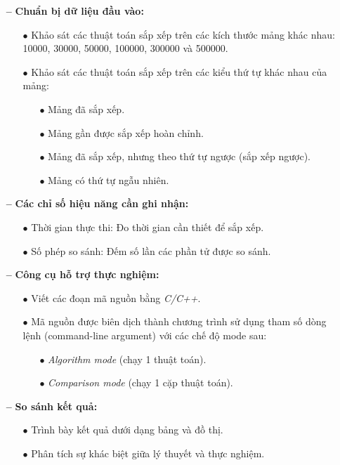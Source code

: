 \begin{itemize}
    \item [\textbf{--}] \textbf{Chuẩn bị dữ liệu đầu vào:}
    \begin{itemize}
    \item [$\bullet$] Khảo sát các thuật toán sắp xếp trên các kích thước mảng khác nhau: 10000, 30000, 50000, 100000, 300000 và 500000.
    \item [$\bullet$] Khảo sát các thuật toán sắp xếp trên các kiểu thứ tự khác nhau của mảng:
        \begin{itemize}
            \item [$\bullet$] Mảng đã sắp xếp.
            \item [$\bullet$] Mảng gần được sắp xếp hoàn chỉnh.
            \item [$\bullet$] Mảng đã sắp xếp, nhưng theo thứ tự ngược (sắp xếp ngược).
            \item [$\bullet$] Mảng có thứ tự ngẫu nhiên.
        \end{itemize}
    \end{itemize}
    \item [\textbf{--}] \textbf{Các chỉ số hiệu năng cần ghi nhận:}
    \begin{itemize}
        \item [$\bullet$] Thời gian thực thi: Đo thời gian cần thiết để sắp xếp.
        \item [$\bullet$] Số phép so sánh: Đếm số lần các phần tử được so sánh.
    \end{itemize}
    \item [\textbf{--}] \textbf{Công cụ hỗ trợ thực nghiệm:}
    \begin{itemize}
        \item [$\bullet$]Viết các đoạn mã nguồn bằng \textit{C/C++}.
        \item [$\bullet$]Mã nguồn được biên dịch thành chương trình sử dụng tham số dòng lệnh (command-line argument) với các chế độ mode sau:
        \begin{itemize}
            \item [$\bullet$] \textit{Algorithm mode} (chạy 1 thuật toán).
            \item [$\bullet$] \textit{Comparison mode} (chạy 1 cặp thuật toán).
        \end{itemize}
    \end{itemize}
    \item [\textbf{--}]\textbf{So sánh kết quả:}
    \begin{itemize}
        \item [$\bullet$]Trình bày kết quả dưới dạng bảng và đồ thị.
        \item [$\bullet$]Phân tích sự khác biệt giữa lý thuyết và thực nghiệm.
    \end{itemize}
\end{itemize}

